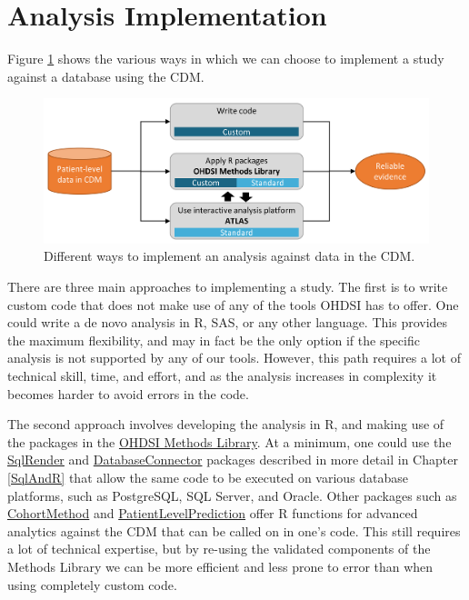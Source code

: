 \documentclass[11pt]{book}
\theoremstyle{definition}
\theoremstyle{definition}
\theoremstyle{definition}
\theoremstyle{remark}
\begin{document}
\section{Analysis Implementation}\label{analysisImplementation}

Figure \ref{fig:implementations} shows the various ways in which we can
choose to implement a study against a database using the CDM.

\begin{figure}

{\centering \includegraphics[width=0.9\linewidth]{images/OhdsiAnalyticsTools/implementations} 

}

\caption{Different ways to implement an analysis against data in the CDM.}\label{fig:implementations}
\end{figure}

There are three main approaches to implementing a study. The first is to
write custom code that does not make use of any of the tools OHDSI has
to offer. One could write a de novo analysis in R, SAS, or any other
language. This provides the maximum flexibility, and may in fact be the
only option if the specific analysis is not supported by any of our
tools. However, this path requires a lot of technical skill, time, and
effort, and as the analysis increases in complexity it becomes harder to
avoid errors in the code.

The second approach involves developing the analysis in R, and making
use of the packages in the
\href{https://ohdsi.github.io/MethodsLibrary/}{OHDSI Methods Library}.
At a minimum, one could use the
\href{https://ohdsi.github.io/SqlRender/}{SqlRender} and
\href{https://ohdsi.github.io/DatabaseConnector/}{DatabaseConnector}
packages described in more detail in Chapter \ref{SqlAndR} that allow
the same code to be executed on various database platforms, such as
PostgreSQL, SQL Server, and Oracle. Other packages such as
\href{https://ohdsi.github.io/CohortMethod/}{CohortMethod} and
\href{https://ohdsi.github.io/PatientLevelPrediction/}{PatientLevelPrediction}
offer R functions for advanced analytics against the CDM that can be
called on in one's code. This still requires a lot of technical
expertise, but by re-using the validated components of the Methods
Library we can be more efficient and less prone to error than when using
completely custom code.
\end{document}
